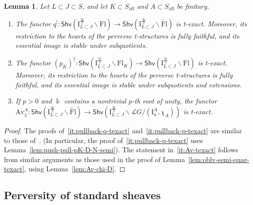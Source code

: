 \documentclass[11pt]{amsart}
\numberwithin{equation}{section}
\theoremstyle{plain}
\newtheorem{lem}[thm]{Lemma}
\theoremstyle{definition}
\newcommand{\I}{{\mathrm I}}
\renewcommand{\k}{\Bbbk}
\newcommand{\sL}{{\mathcal L}}
\newcommand{\semi}{{{\frac{\infty}{2}}}}
\newcommand{\quar}{{{\frac{\infty}{4}}}}
\newcommand{\oblv}{\mathrm{oblv}}
\newcommand{\Av}{\mathrm{Av}}
\newcommand{\af}{\mathrm{aff}}
\newcommand{\Shv}{\mathsf{Shv}}
\newcommand{\Fl}{\mathrm{Fl}}
\newcommand{\tFl}{\widetilde{\Fl}}
\newcommand{\Iu}{\mathrm{I}_{\mathrm{u}}}
\begin{document}
\begin{lem}
\label{lem:pullback-Av-texact}
Let $L\subset J\subset S$, and let $K\subset S_\af$ and $A \subset S_\af$ be finitary. 
\begin{enumerate}
\item 
\label{it:pullback-q-texact}
The functor $q^!: \Shv\left(\I_{L\subset J}^{\semi}\backslash \Fl\right)\rightarrow \Shv\left(\I_{L\subset J}^{\semi}\backslash \tFl\right)$ is t-exact. 
Moreover, its restriction to the hearts of the perverse t-structures is fully faithful, and its essential image is stable under subquotients. 
\item
\label{it:pullback-p-texact}
The functor $(p_K)^\dag:\Shv\left(\I_{L\subset J}^{\semi}\backslash \Fl_K\right)\rightarrow \Shv\left(\I_{L\subset J}^{\semi}\backslash \Fl\right)$ is t-exact. 
Moreover, its restriction to the hearts of the perverse t-structures is fully faithful, and its essential image is stable under subquotients and extensions. 
\item
\label{it:Av-texact}
If $p>0$ and $\k$ contains a nontrivial $p$-th root of unity,
the functor $\Av^A_{\chi}:\Shv\left(\I_{L\subset J}^{\semi}\backslash \tFl\right)\rightarrow \Shv\left(\I_{L\subset J}^{\semi}\backslash \sL G/(\Iu^A,\chi_A)\right)$ is t-exact. 
\end{enumerate}
\end{lem}

\begin{proof}
The proofs of~\eqref{it:pullback-q-texact} and~\eqref{it:pullback-p-texact} are similar to those of~\cite[Lemmas 6.6 \& 6.8]{adr}. (In particular, the proof of~\eqref{it:pullback-p-texact} uses Lemma~\ref{lem:push-pull-pK-D-N-semi}).  
The statement in~\eqref{it:Av-texact} follows from similar arguments as those used in the proof of Lemma~\ref{lem:oblv-semi-quar-texact}, using Lemma~\ref{lem:Av-chi-D}. 
\end{proof}


\subsection{Perversity of standard sheaves} 
\end{document}
